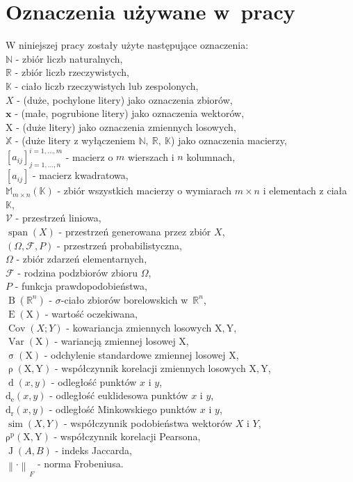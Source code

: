 \documentclass[12pt,a4paper]{report}
\newcommand{\setR}{\mathbb{R}}
\newcommand{\setK}{\mathbb{K}}
\newcommand{\setN}{\mathbb{N}}
\newcommand{\ro}[2]{\operatorname{\rho}\left( {#1},{#2} \right)}
\newcommand{\rop}[2]{\operatorname{\rho^p}\left( {#1},{#2} \right)}
\newcommand{\J}[2]{\operatorname{J}\left({#1}, {#2} \right)}
\newcommand{\similarity}[2]{\operatorname{sim}\left({#1}, {#2} \right)}
\newcommand{\przestrzen}[1]{\operatorname{span}\left({#1} \right)}
\newcommand{\distance}[2]{\operatorname{d}\left({#1}, {#2} \right)}
\newcommand{\distancee}[2]{\operatorname{d_r}\left({#1}, {#2} \right)}
\newcommand{\distanceee}[2]{\operatorname{d_e}\left({#1}, {#2} \right)}
\newcommand{\Covariance}[2]{\operatorname{Cov}\left({#1}; {#2} \right)}
\newcommand{\norm}[2][]{\left\| {#2} \right\|_{#1}}
\newcommand{\variance}[1]{\operatorname{Var}\left({#1} \right)}
\newcommand{\e}[1]{\operatorname{E}\left({#1} \right)}
\newcommand{\standard}[1]{\operatorname{\sigma}\left({#1} \right)}
\newcommand{\sigmacialo}[1]{\operatorname{B}\left({#1} \right)}
\begin{document}
\section{Oznaczenia używane w~pracy}
W niniejszej pracy zostały użyte następujące oznaczenia:
\\$\setN$ - zbiór liczb naturalnych,
\\$\setR$ - zbiór liczb rzeczywistych,
\\$\setK$ - ciało liczb rzeczywistych lub zespolonych,
\\$\mathit{X}$ - (duże, pochylone litery) jako oznaczenia zbiorów,
\\$\mathbf{x}$ - (małe, pogrubione litery) jako oznaczenia wektorów,
\\$\mathrm{X}$ - (duże litery) jako oznaczenia zmiennych losowych,
\\$\mathbb{X}$ - (duże litery z wyłączeniem $\setN, \: \setR, \: \setK$) jako oznaczenia macierzy,
\\$[a_{ij}]_{j = 1, \ldots, n}^{i = 1, \ldots , m}$ - macierz o $m$ wierszach i $n$ kolumnach,
\\$[a_{ij}]$ - macierz kwadratowa,
\\$\mathbb{M}_{m \times n}(\setK)$ - zbiór wszystkich macierzy o wymiarach $m \times n$ i elementach z ciała $\setK$,
\\$\mathcal{V}$ - przestrzeń liniowa,
\\$\przestrzen{\mathit{X}}$ - przestrzeń generowana przez zbiór $\mathit{X}$,
\\$(\Omega, \mathcal{F}, P)$ - przestrzeń probabilistyczna,
\\$\Omega$ - zbiór zdarzeń elementarnych,
\\$\mathcal{F}$ - rodzina podzbiorów zbioru $\Omega$,
\\$P$ - funkcja prawdopodobieństwa,
\\$\sigmacialo{\setR^n}$ - $\sigma$-ciało zbiorów borelowskich w~$\setR^n$,
\\$\e{\mathrm{X}}$ - wartość oczekiwana,
\\$\Covariance{X}{Y}$ - kowariancja zmiennych losowych $\mathrm{X},\mathrm{Y}$,
\\$\variance{\mathrm{X}}$ - wariancją zmiennej losowej $\mathrm{X}$,
\\$\standard{\mathrm{X}}$ - odchylenie standardowe zmiennej losowej $\mathrm{X}$,
\\$\ro{\mathrm{X}}{\mathrm{Y}}$ - współczynnik korelacji zmiennych losowych $\mathrm{X},\mathrm{Y}$,
\\$\distance{x}{y}$ - odległość punktów $x$ i $y$,
\\$\distanceee{x}{y}$ - odległość euklidesowa punktów $x$ i $y$,
\\$\distancee{x}{y}$ - odległość Minkowskiego punktów $x$ i $y$,
\\$\similarity{X}{Y}$ - współczynnik podobieństwa wektorów $X$ i $Y$,
\\$\rop{\mathrm{X}}{\mathrm{Y}}$ - współczynnik korelacji Pearsona,
\\$\J{\mathit{A}}{\mathit{B}}$ - indeks Jaccarda,
\\ ${\norm{\cdot}}_F$ - norma Frobeniusa.
\end{document}
